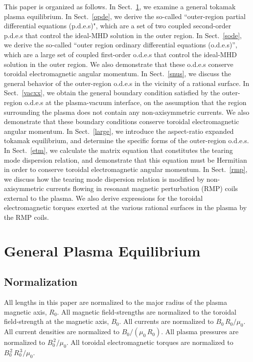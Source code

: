\documentclass[12pt,prb,aps]{revtex4-1}
\begin{document}
This paper is organized as follows. In Sect.~\ref{geq}, we examine a general tokamak plasma equilibrium. In Sect.~\ref{opde}, we
derive the so-called ``outer-region  partial differential equations (p.d.e.s)", which are a set of two coupled second-order p.d.e.s that control   the ideal-MHD solution in the outer region. In
Sect.~\ref{sode}, we derive the so-called ``outer region ordinary differential equations  (o.d.e.s)'', which are a large set of coupled first-order 
o.d.e.s that control the ideal-MHD solution in the outer region. We also demonstrate that these o.d.e.s conserve toroidal electromagnetic
angular momentum. In Sect.~\ref{snus}, we discuss the general behavior of the outer-region o.d.e.s in the vicinity of a rational surface. 
In Sect.~\ref{vacxx}, we obtain the general boundary condition satisfied by the outer-region o.d.e.s at the plasma-vacuum interface, on the assumption that
the region surrounding the plasma does not contain any non-axisymmetric currents. We also demonstrate that these boundary conditions conserve
toroidal electromagnetic angular momentum. In Sect.~\ref{large}, we introduce the aspect-ratio expanded tokamak equilibrium, and determine the
specific forms of the outer-region o.d.e.s. In Sect.~\ref{etm}, we calculate the matrix equation that constitutes the tearing mode dispersion relation, and
demonstrate that this equation must be Hermitian in order to conserve toroidal electromagnetic angular momentum. In Sect.~\ref{rmp}, 
we discuss how the tearing mode dispersion relation is modified by non-axisymmetric currents flowing in
 resonant magnetic perturbation (RMP) coils external to the plasma. We also derive expressions for the toroidal electromagnetic
torques exerted at the various rational surfaces in the plasma by the RMP coils.

\section{General Plasma Equilibrium}\label{geq}
\subsection{Normalization}\label{coords}
All lengths in this paper are normalized to  the major radius of the plasma magnetic axis, $R_0$. All magnetic field-strengths
are normalized to the  toroidal field-strength at the magnetic axis, $B_0$. All currents are normalized to $B_0\,R_0/\mu_0$. All current densities are normalized to $B_0/(\mu_0\,R_0)$.  All plasma pressures are normalized to $B_0^{\,2}/\mu_0$.
All toroidal electromagnetic torques are normalized to $B_0^{\,2}\,R_0^{\,3}/\mu_0$. 
\end{document}
